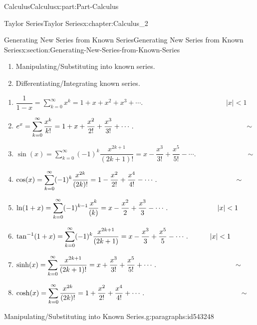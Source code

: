 \documentclass[oneside,10pt,]{book}
\numberwithin{equation}{section}
\begin{document}
\begin{partptx}{Calculus}{}{Calculus}{}{}{x:part:Part-Calculus}
\begin{chapterptx}{Taylor Series}{}{Taylor Series}{}{}{x:chapter:Calculus_2}
\begin{sectionptx}{Generating New Series from Known Series}{}{Generating New Series from Known Series}{}{}{x:section:Generating-New-Series-from-Known-Series}
\par
%
\begin{enumerate}
\item{}Manipulating\slash{}Substituting into known series.%
\item{}Differentiating\slash{}Integrating known series.%
\end{enumerate}
%
\par
%
\par
%
\begin{enumerate}
\item{}\(\displaystyle \dfrac{1}{1-x}=\sum_{k=0}^{\infty}x^{k}=1+x+x^{2}+x^{3}+\cdots . \hspace{5cm}  \lvert x\rvert < 1  \)%
\item{}\(\displaystyle e^{x}=\sum_{k=0}^{\infty}\dfrac{x^{k}}{k!}=1+x+\dfrac{x^{2}}{2!} +\dfrac{x^{3}}{3!}+\cdots .  \hspace{5.6cm}\sim \)%
\item{}\(\displaystyle \sin(x)=\sum_{k=0}^{\infty}(-1)^{k}\dfrac{x^{2k+1}}{(2k+1)!}=x-\dfrac{x^{3}}{3!} +\dfrac{x^{5}}{5!}-\cdots .\hspace{3cm}\sim \)%
\item{}\(\displaystyle \cos(x)=\sum_{k=0}^{\infty}(-1)^{k}\dfrac{x^{2k}}{(2k)!}=1-\dfrac{x^{2}}{2!} +\dfrac{x^{4}}{4!}-\cdots .\hspace{3.9cm} \sim \)%
\item{}\(\displaystyle \ln(1+x)=\sum_{k=0}^{\infty}(-1)^{k-1}\dfrac{x^{k}}{(k)}=x-\dfrac{x^{2}}{2} +\dfrac{x^{3}}{3}-\cdots . \hspace{2.5cm}  \lvert x\rvert < 1 \)%
\item{}\(\displaystyle \tan^{-1}(1+x)=\sum_{k=0}^{\infty}(-1)^{k}\dfrac{x^{2k+1}}{(2k+1)}=x-\dfrac{x^{3}}{3} +\dfrac{x^{5}}{5}-\cdots . \hspace{1.1cm} \lvert x\rvert < 1 \)%
\item{}\(\displaystyle \sinh(x)=\sum_{k=0}^{\infty}\dfrac{x^{2k+1}}{(2k+1)!}=x+\dfrac{x^{3}}{3!} +\dfrac{x^{5}}{5!}+\cdots . \hspace{3.9cm} \sim \)%
\item{}\(\displaystyle \cosh(x)=\sum_{k=0}^{\infty}\dfrac{x^{2k}}{(2k)!}=1+\dfrac{x^{2}}{2!} +\dfrac{x^{4}}{4!}+\cdots . \hspace{4.8cm} \sim \)%
\end{enumerate}
%
\begin{paragraphs}{Manipulating\slash{}Substituting into Known Series.}{g:paragraphs:id543248}%
\end{paragraphs}%

\end{sectionptx}
\end{chapterptx}
\end{partptx}
\end{document}
